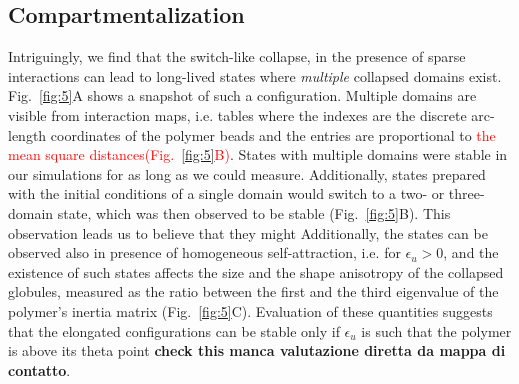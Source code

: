 \documentclass[
preprint,
a4paper,
12pt,
superscriptaddress,
pre]{revtex4}
\newcommand{\rev}[1]{\textcolor{red}{#1}}
\begin{document}


\subsection*{Compartmentalization}


Intriguingly, we find that the switch-like collapse, in the presence
of sparse interactions can lead to long-lived states where
\emph{multiple} collapsed domains exist. Fig.~\ref{fig:5}A shows a
snapshot of such a configuration. Multiple domains are visible from
interaction maps, i.e. tables where the indexes are the discrete
arc-length coordinates of the polymer beads and the entries are
proportional to \rev{the mean square distances(Fig.~\ref{fig:5}B)}.
States with multiple
domains were stable in our simulations for as long as we could
measure. Additionally, states prepared with the initial conditions of
a single domain would switch to a two- or three-domain state, which
was then observed to be stable (Fig.~\ref{fig:5}B). This observation
leads us to believe that they might 
%
Additionally, the states can be observed also in presence of
homogeneous self-attraction, i.e. for $\epsilon_u>0$, and the
existence of such states affects the size and the shape anisotropy of
the collapsed globules, measured as the ratio between the first and
the third eigenvalue of the polymer's inertia matrix
(Fig.~\ref{fig:5}C). Evaluation of these quantities suggests that the
elongated configurations can be stable only if $\epsilon_u$ is such
that the polymer is above its theta point \textbf{check this manca
  valutazione diretta da mappa di contatto}.
\end{document}
